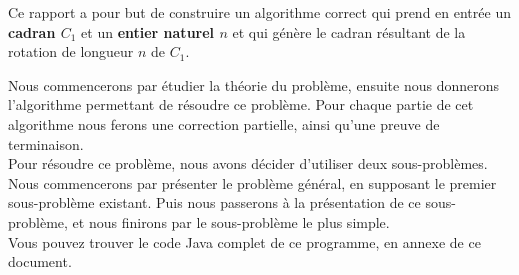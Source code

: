 Ce rapport a pour but de construire un algorithme correct qui prend en entrée un \textbf{cadran $C_{1}$} et un \textbf{entier naturel $n$} et qui génère le cadran résultant de la rotation de longueur $n$ de $C_{1}$.

Nous commencerons par étudier la théorie du problème, ensuite nous donnerons l'algorithme permettant de résoudre ce problème. Pour chaque partie de cet algorithme nous  ferons une correction partielle, ainsi qu'une preuve de terminaison. \\

Pour résoudre ce problème, nous avons décider d'utiliser deux sous-problèmes. Nous commencerons par présenter le problème général, en supposant le premier sous-problème existant. Puis nous passerons à la présentation de ce sous-problème, et nous finirons par le sous-problème le plus simple.  \\

Vous pouvez trouver le code Java complet de ce programme, en annexe de ce document. \\